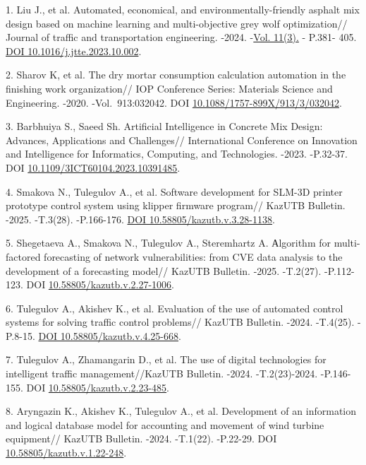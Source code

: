 \begin{refs}
1. Liu J., et al. Automated, economical, and environmentally-friendly
asphalt mix design based on machine learning and multi-objective grey
wolf optimization// Journal of traffic and transportation engineering.
-2024.
-\href{file:///C:/Users/admin/OneDrive/Desktop/ZU/2026/ARTICLE/Vol.\%2011(3)}{Vol.
11(3).} - P.381- 405.
\href{https://doi.org/10.1016/j.jtte.2023.10.002}{DOI
10.1016/j.jtte.2023.10.002}.

2. Sharov K, et al. The dry mortar consumption calculation automation in
the finishing work organization// IOP Conference Series: Materials
Science and Engineering. -2020. -Vol.~913:032042. DOI
\href{https://iopscience.iop.org/article/10.1088/1757-899X/913/3/032042}{10.1088/1757-899X/913/3/032042}.

3. Barbhuiya S., Saeed Sh. Artificial Intelligence in Concrete Mix
Design: Advances, Applications and Challenges// International Conference
on Innovation and Intelligence for Informatics, Computing, and
Technologies. -2023. -P.32-37. DOI
\href{https://doi.org/10.1109/3ICT60104.2023.10391485}{10.1109/3ICT60104.2023.10391485}.

4. Smakova N., Tulegulov A., et al. Software development for SLM-3D
printer prototype control system using klipper firmware program// KazUTB
Bulletin. -2025. -T.3(28). -P.166-176.
\href{https://doi.org/10.58805/kazutb.v.3.28-1138}{DOI
10.58805/kazutb.v.3.28-1138}.

5. Shegetaeva A., Smakova N., Tulegulov A., Steremhartz A. Аlgorithm for
multi-factored forecasting of network vulnerabilities: from CVE data
analysis to the development of a forecasting model// KazUTB Bulletin.
-2025. -T.2(27). -P.112-123. DOI
\href{https://doi.org/10.58805/kazutb.v.2.27-1006}{10.58805/kazutb.v.2.27-1006}.

6. Tulegulov A., Akishev K., et al. Evaluation of the use of automated
control systems for solving traffic control problems// KazUTB Bulletin.
-2024. -T.4(25). -P.8-15.
\href{https://doi.org/10.58805/kazutb.v.4.25-668}{DOI
10.58805/kazutb.v.4.25-668}.

7. Tulegulov A., Zhamangarin D., et al. The use of digital technologies
for intelligent traffic management//KazUTB Bulletin. -2024.
-T.2(23)-2024. -P.146-155. DOI
\href{https://doi.org/10.58805/kazutb.v.2.23-485}{10.58805/kazutb.v.2.23-485}.

8. Aryngazin K., Akishev K., Tulegulov A., et al. Development of an
information and logical database model for accounting and movement of
wind turbine equipment// KazUTB Bulletin. -2024. -T.1(22). -P.22-29. DOI
\href{https://doi.org/10.58805/kazutb.v.1.22-248}{10.58805/kazutb.v.1.22-248}.


\end{refs}

